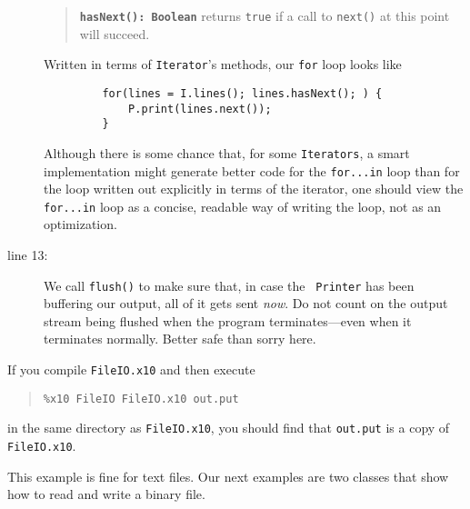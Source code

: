 \begin{description}
\begin{quote}
{\tt {\bf hasNext(): Boolean}} returns {\tt true} if a call to {\tt next()} at this
point will succeed.
\end{quote}
Written in terms of {\tt Iterator}'s methods, our {\tt for} loop looks like
\begin{verbatim}
         for(lines = I.lines(); lines.hasNext(); ) {
             P.print(lines.next());
         }
\end{verbatim}
Although there is some chance that, for some {\tt Iterators},
a smart implementation might generate better
code for the {\tt for...in} loop than for the loop written out explicitly
in terms of the iterator,
one should view the {\tt for...in} loop as
a concise, readable way of writing the loop, not as an optimization.
\item[line 13:] We call {\tt flush()} to make sure that, in case the {\tt
Printer} has been buffering our output, all of it gets sent {\em now}.  Do not
count on the output stream being flushed when the program terminates---even when
it terminates normally. Better safe than sorry here.
\end{description}

If you compile {\tt FileIO.x10} and then execute
\begin{quote}
\begin{verbatim}
%x10 FileIO FileIO.x10 out.put
\end{verbatim}
\end{quote}
in the same directory as {\tt FileIO.x10}, you should find that {\tt out.put}
is a copy of {\tt FileIO.x10}.

This example is fine for text files.  Our next examples
are two classes that show how to read and write a binary file.  

